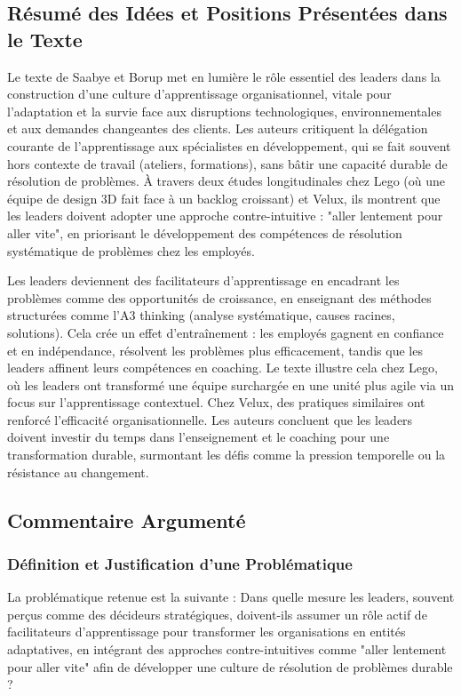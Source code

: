 \documentclass{rapportECL}
\begin{document}
\subsection{Résumé des Idées et Positions Présentées dans le Texte}
Le texte de Saabye et Borup met en lumière le rôle essentiel des leaders dans la construction d'une culture d'apprentissage organisationnel, vitale pour l'adaptation et la survie face aux disruptions technologiques, environnementales et aux demandes changeantes des clients. Les auteurs critiquent la délégation courante de l'apprentissage aux spécialistes en développement, qui se fait souvent hors contexte de travail (ateliers, formations), sans bâtir une capacité durable de résolution de problèmes. À travers deux études longitudinales chez Lego (où une équipe de design 3D fait face à un backlog croissant) et Velux, ils montrent que les leaders doivent adopter une approche contre-intuitive : "aller lentement pour aller vite", en priorisant le développement des compétences de résolution systématique de problèmes chez les employés.

Les leaders deviennent des facilitateurs d'apprentissage en encadrant les problèmes comme des opportunités de croissance, en enseignant des méthodes structurées comme l'A3 thinking (analyse systématique, causes racines, solutions). Cela crée un effet d'entraînement : les employés gagnent en confiance et en indépendance, résolvent les problèmes plus efficacement, tandis que les leaders affinent leurs compétences en coaching. Le texte illustre cela chez Lego, où les leaders ont transformé une équipe surchargée en une unité plus agile via un focus sur l'apprentissage contextuel. Chez Velux, des pratiques similaires ont renforcé l'efficacité organisationnelle. Les auteurs concluent que les leaders doivent investir du temps dans l'enseignement et le coaching pour une transformation durable, surmontant les défis comme la pression temporelle ou la résistance au changement.

\subsection{Commentaire Argumenté}

\subsubsection{Définition et Justification d’une Problématique}
La problématique retenue est la suivante : Dans quelle mesure les leaders, souvent perçus comme des décideurs stratégiques, doivent-ils assumer un rôle actif de facilitateurs d'apprentissage pour transformer les organisations en entités adaptatives, en intégrant des approches contre-intuitives comme "aller lentement pour aller vite" afin de développer une culture de résolution de problèmes durable ?
\end{document}
